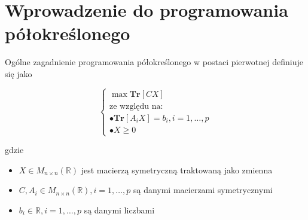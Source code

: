 \section{Wprowadzenie do programowania półokreślonego}

\begin{definition}
    Ogólne zagadnienie programowania półokreślonego w postaci pierwotnej definiuje się jako

    $$
        \begin{cases}
            \max \textbf{Tr}[CX] \\
            \text{ze względu na:} \\
            \bullet \textbf{Tr}[A_{i} X] = b_{i}, i = 1, \ldots, p \\
            \bullet X \geq 0
        \end{cases}
    $$

    gdzie

    \begin{itemize}
        \item $X \in M_{n \times n}(\mathbb{R})$ jest macierzą symetryczną traktowaną jako zmienna
        \item $C, A_{i} \in M_{n \times n}(\mathbb{R}), i = 1, \ldots , p$ są danymi macierzami symetrycznymi
        \item $b_{i} \in \mathbb{R}, i = 1, \ldots, p$ są danymi liczbami
    \end{itemize}
\end{definition}
